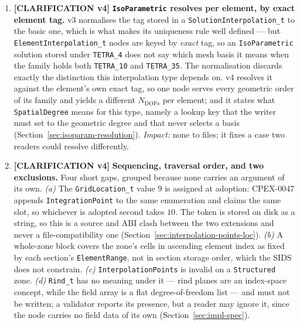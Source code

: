 \documentclass[11pt,letterpaper]{article}
\newif\ifvfourdraft
\newenvironment{v4block}{\ifvfourdraft\color{v4violet}\fi\ignorespaces}{\par}
\newcommand{\CLARIFYIV}{\ifvfourdraft
  \textcolor{v4violet}{\textbf{[CLARIFICATION v4]}}\else
  \textcolor{clarifybrown}{\textbf{[CLARIFICATION v4]}}\fi}
\begin{document}
{\begin{v4block}
\begin{enumerate}[leftmargin=1.4em,itemsep=0.5em]
    The asymmetry is deliberate.  An unresolvable basis means the stored length
    cannot be \emph{checked}, not that the arrays cannot be \emph{read}: their
    extents are on disk.  Refusing to open would strand data that earlier
    versions accepted, for no gain --- the same reasoning the Compatibility
    section applies to \texttt{GridLocation}.  Rejecting on write is what keeps
    new files well formed.  \textit{Impact:} none to conformant files.

  \item \CLARIFYIV{} \textbf{\texttt{IsoParametric} resolves per element, by exact
    element tag.}  v3 normalises the tag stored in a \texttt{SolutionInterpolation\_t}
    to the basic one, which is what makes its uniqueness rule well defined --- but
    \texttt{ElementInterpolation\_t} nodes are keyed by \emph{exact} tag, so an
    \texttt{IsoParametric} solution stored under \texttt{TETRA\_4} does not say
    which mesh basis it means when the family holds both \texttt{TETRA\_10} and
    \texttt{TETRA\_35}.  The normalisation discards exactly the distinction this
    interpolation type depends on.  v4 resolves it against the element's own exact
    tag, so one node serves every geometric order of its family and yields a
    different $N_\mathrm{DOFs}$ per element; and it states what
    \texttt{SpatialDegree} means for this type, namely a lookup key that the writer
    must set to the geometric degree and that never selects a basis
    (Section~\ref{sec:isoparam-resolution}).  \textit{Impact:} none to files; it
    fixes a case two readers could resolve differently.

  \item \CLARIFYIV{} \textbf{Sequencing, traversal order, and two exclusions.}
    Four short gaps, grouped because none carries an argument of its own.
    \emph{(a)} The \texttt{GridLocation\_t} value $9$ is assigned at adoption:
    CPEX-0047 appends \texttt{IntegrationPoint} to the same enumeration and claims
    the same slot, so whichever is adopted second takes $10$.  The token is stored
    on disk as a string, so this is a source and ABI clash between the two
    extensions and never a file-compatibility one
    (Section~\ref{sec:interpolation-points-loc}).  \emph{(b)} A whole-zone block
    covers the zone's cells in ascending element index as fixed by each section's
    \texttt{ElementRange}, not in section storage order, which the SIDS does not
    constrain.  \emph{(c)} \texttt{InterpolationPoints} is invalid on a
    \texttt{Structured} zone.  \emph{(d)} \texttt{Rind\_t} has no meaning under it
    --- rind planes are an index-space concept, while the field array is a flat
    degree-of-freedom list --- and must not be written; a validator reports its
    presence, but a reader may ignore it, since the node carries no field data
    of its own (Section~\ref{sec:impl-spec}).


\end{enumerate}
\end{v4block}}
\end{document}
